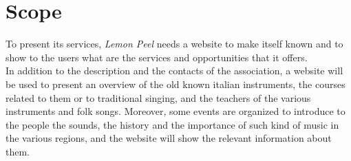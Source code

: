 \documentclass[../../DD.tex]{subfiles}
\begin{document}
\section{Scope}
	To present its services, \textit{Lemon Peel} needs a website to make itself known and to show to the users what are the services and opportunities that it offers. \\
	In addition to the description and the contacts of the association, a website will be used to present an overview of the old known italian instruments, the courses related to them or to traditional singing, and the teachers of the various instruments and folk songs. Moreover, some events are organized to introduce to the people the sounds, the history and the importance of such kind of music in the various regions, and the website will show the relevant information about them.
\end{document}
